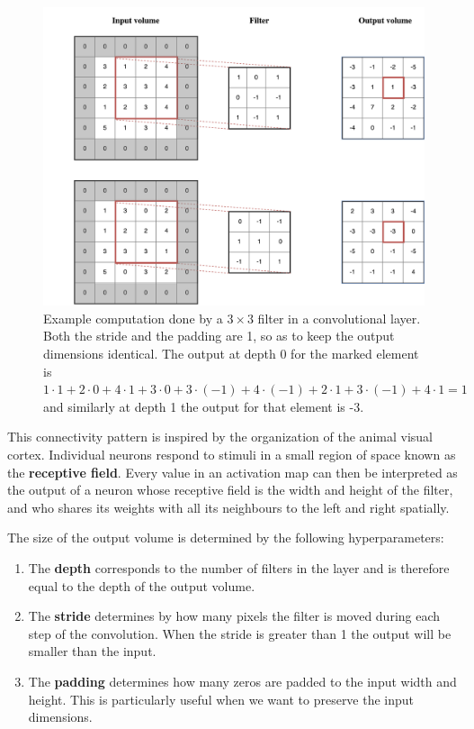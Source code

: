 \documentclass[12pt,a4paper,twoside,openright]{report}
\begin{document}
\begin{enumerate}
	\begin{figure}
		\centering
		\includegraphics[scale=0.6]{conv_example}
		\caption[Example computation done by a $3 \times 3$ filter in a convolutional layer.]{Example computation done by a $3 \times 3$ filter in a convolutional layer. Both the stride and the padding are 1, so as to keep the output dimensions identical. The output at depth 0 for the marked element is $1 \cdot 1 + 2 \cdot 0 + 4 \cdot 1 + 3 \cdot 0 + 3 \cdot (-1) + 4 \cdot (-1) + 2 \cdot 1 + 3 \cdot (-1) + 4 \cdot 1 = 1$ and similarly at depth 1 the output for that element is -3.}
		\label{fig:conv_example}
	\end{figure}

	This connectivity pattern is inspired by the organization of the animal visual cortex. Individual neurons respond to stimuli in a small region of space known as the \textbf{receptive field}. Every value in an activation map can then be interpreted as the output of a neuron whose receptive field is the width and height of the filter, and who shares its weights with all its neighbours to the left and right spatially.

	The size of the output volume is determined by the following hyperparameters:
	\begin{enumerate}
		\item The \textbf{depth} corresponds to the number of filters in the layer and is therefore equal to the depth of the output volume.
		\item The \textbf{stride} determines by how many pixels the filter is moved during each step of the convolution. When the stride is greater than 1 the output will be smaller than the input.
		\item The \textbf{padding} determines how many zeros are padded to the input width and height. This is particularly useful when we want to preserve the input dimensions.
	\end{enumerate}
	

\end{enumerate}
\end{document}
